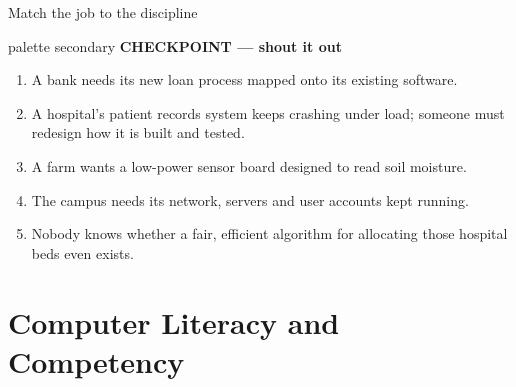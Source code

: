\documentclass[aspectratio=169]{beamer}
\newcommand{\checkpoint}[1]{%
  \begin{beamercolorbox}[sep=4pt, rounded=true, wd=\textwidth]{palette secondary}
    \centering\small\textbf{\faHandPaper\; CHECKPOINT --- #1}
  \end{beamercolorbox}%
}
\begin{document}
\begin{frame}{Match the job to the discipline}
  \checkpoint{shout it out}
  \vspace{0.3cm}
  \small
  \begin{enumerate}[<+->]
    \item A bank needs its new loan process mapped onto its existing software.
    \item A hospital's patient records system keeps crashing under load; someone
          must redesign how it is built and tested.
    \item A farm wants a low-power sensor board designed to read soil moisture.
    \item The campus needs its network, servers and user accounts kept running.
    \item Nobody knows whether a fair, efficient algorithm for allocating those
          hospital beds even exists.
  \end{enumerate}
  \vspace{0.3cm}
\end{frame}

\section{Computer Literacy and Competency}
\end{document}
